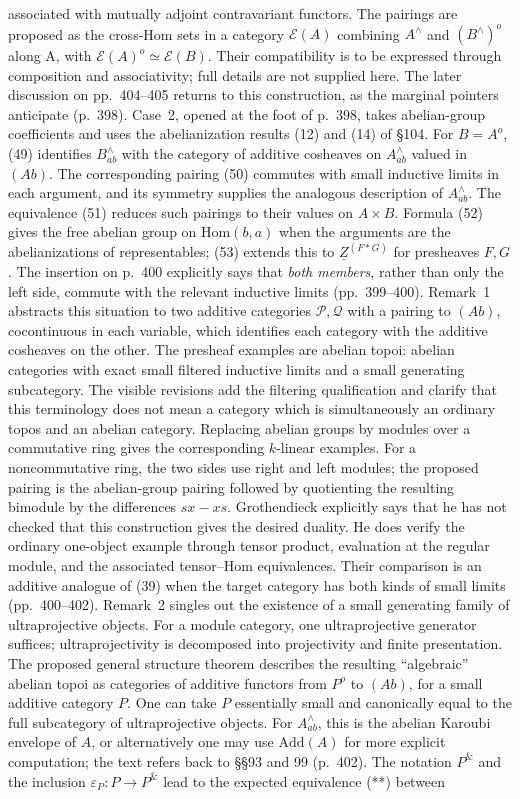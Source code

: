 associated with mutually adjoint contravariant functors. The pairings are proposed as the cross-Hom sets in a category $\mathcal E(A)$ combining $A^\wedge$ and $(B^\wedge)^o$ along A, with $\mathcal E(A)^o\simeq\mathcal E(B)$. Their compatibility is to be expressed through composition and associativity; full details are not supplied here. The later discussion on pp.\ 404--405 returns to this construction, as the marginal pointers anticipate (p.\ 398). Case~2, opened at the foot of p.\ 398, takes abelian-group coefficients and uses the abelianization results (12) and (14) of \S104. For $B=A^o$, (49) identifies $B^\wedge_{ab}$ with the category of additive cosheaves on $A^\wedge_{ab}$ valued in $(Ab)$. The corresponding pairing (50) commutes with small inductive limits in each argument, and its symmetry supplies the analogous description of $A^\wedge_{ab}$. The equivalence (51) reduces such pairings to their values on $A\times B$. Formula (52) gives the free abelian group on $\mathrm{Hom}(b,a)$ when the arguments are the abelianizations of representables; (53) extends this to $\underline Z^{(F*G)}$ for presheaves $F,G$. The insertion on p.\ 400 explicitly says that \emph{both members}, rather than only the left side, commute with the relevant inductive limits (pp.\ 399--400). Remark~1 abstracts this situation to two additive categories $\mathcal P,\mathcal Q$ with a pairing to $(Ab)$, cocontinuous in each variable, which identifies each category with the additive cosheaves on the other. The presheaf examples are abelian topoi: abelian categories with exact small filtered inductive limits and a small generating subcategory. The visible revisions add the filtering qualification and clarify that this terminology does not mean a category which is simultaneously an ordinary topos and an abelian category. Replacing abelian groups by modules over a commutative ring gives the corresponding $k$-linear examples. For a noncommutative ring, the two sides use right and left modules; the proposed pairing is the abelian-group pairing followed by quotienting the resulting bimodule by the differences $sx-xs$. Grothendieck explicitly says that he has not checked that this construction gives the desired duality. He does verify the ordinary one-object example through tensor product, evaluation at the regular module, and the associated tensor--Hom equivalences. Their comparison is an additive analogue of (39) when the target category has both kinds of small limits (pp.\ 400--402). Remark~2 singles out the existence of a small generating family of ultraprojective objects. For a module category, one ultraprojective generator suffices; ultraprojectivity is decomposed into projectivity and finite presentation. The proposed general structure theorem describes the resulting “algebraic” abelian topoi as categories of additive functors from $P^o$ to $(Ab)$, for a small additive category $P$. One can take $P$ essentially small and canonically equal to the full subcategory of ultraprojective objects. For $A^\wedge_{ab}$, this is the abelian Karoubi envelope of $A$, or alternatively one may use $\mathrm{Add}(A)$ for more explicit computation; the text refers back to \S\S93 and 99 (p.\ 402). The notation $P^{\&}$ and the inclusion $\varepsilon_P:P\to P^{\&}$ lead to the expected equivalence (**) between 